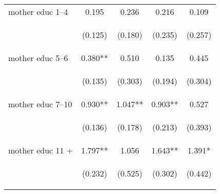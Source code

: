 \documentclass{article}[11pt,subeqn]
\begin{document}
\begin{spacing}{1.5}
\begin{table}[htpb!]
\begin{center}
\begin{tabular}{lcccc}
mother educ 1--4 & 0.195 & 0.236 & 0.216 & 0.109 \\
\vspace{4pt} & \begin{footnotesize}(0.125)\end{footnotesize} & \begin{footnotesize}(0.180)\end{footnotesize} & \begin{footnotesize}(0.235)\end{footnotesize} & \begin{footnotesize}(0.257)\end{footnotesize} \\
mother educ 5--6 & 0.380** & 0.510 & 0.135 & 0.445 \\
\vspace{4pt} & \begin{footnotesize}(0.135)\end{footnotesize} & \begin{footnotesize}(0.303)\end{footnotesize} & \begin{footnotesize}(0.194)\end{footnotesize} & \begin{footnotesize}(0.304)\end{footnotesize} \\
mother educ 7--10 & 0.930** & 1.047** & 0.903** & 0.527 \\
\vspace{4pt} & \begin{footnotesize}(0.136)\end{footnotesize} & \begin{footnotesize}(0.178)\end{footnotesize} & \begin{footnotesize}(0.213)\end{footnotesize} & \begin{footnotesize}(0.393)\end{footnotesize} \\
mother educ 11 + & 1.797** & 1.056 & 1.643** & 1.391* \\
\vspace{4pt} & \begin{footnotesize}(0.232)\end{footnotesize} & \begin{footnotesize}(0.525)\end{footnotesize} & \begin{footnotesize}(0.302)\end{footnotesize} & \begin{footnotesize}(0.442)\end{footnotesize} \\

\end{tabular}
\end{center}
\end{table}
\end{spacing}
\end{document}
